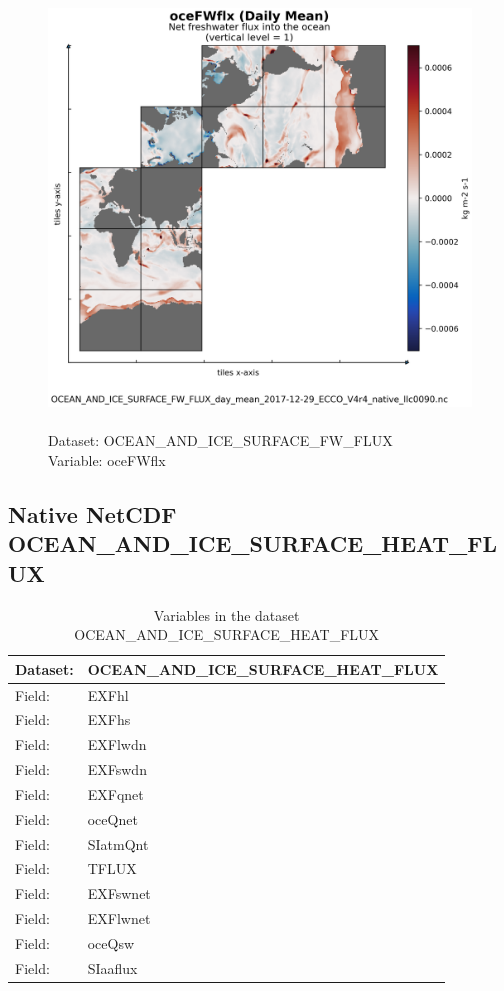 \begin{figure}[H]
\centering
\includegraphics[scale=0.5]{../images/plots/native_plots/Ocean_and_Sea-Ice_Surface_Freshwater_Fluxes/oceFWflx.png}
\caption{\\Dataset: OCEAN\_AND\_ICE\_SURFACE\_FW\_FLUX\\Variable: oceFWflx}
\label{tab:table-OCEAN_AND_ICE_SURFACE_FW_FLUX_oceFWflx-Plot}
\end{figure}
\pagebreak
\subsection{Native NetCDF OCEAN\_AND\_ICE\_SURFACE\_HEAT\_FLUX}
\newp
\begin{longtable}{|p{}|p{}|}
\caption{Variables in the dataset OCEAN\_AND\_ICE\_SURFACE\_HEAT\_FLUX}
\label{tab:table-OCEAN_AND_ICE_SURFACE_HEAT_FLUX-fields} \\ 
\hline \endhead \hline \endfoot
\rowcolor{lightgray} \textbf{Dataset:} & \textbf{OCEAN\_AND\_ICE\_SURFACE\_HEAT\_FLUX} \\ \hline
Field: &EXFhl \\ \hline
Field: &EXFhs \\ \hline
Field: &EXFlwdn \\ \hline
Field: &EXFswdn \\ \hline
Field: &EXFqnet \\ \hline
Field: &oceQnet \\ \hline
Field: &SIatmQnt \\ \hline
Field: &TFLUX \\ \hline
Field: &EXFswnet \\ \hline
Field: &EXFlwnet \\ \hline
Field: &oceQsw \\ \hline
Field: &SIaaflux \\ \hline
\end{longtable}

